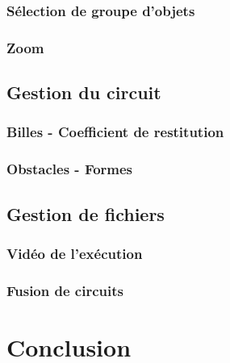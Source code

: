 \documentclass{report}
\begin{document}
\subsection{Sélection de groupe d'objets}

\subsection{Zoom}

\section{Gestion du circuit}

\subsection{Billes - Coefficient de restitution}

\subsection{Obstacles - Formes}

\section{Gestion de fichiers}

\subsection{Vidéo de l'exécution}

\subsection{Fusion de circuits}

\chapter{Conclusion}
\end{document}
